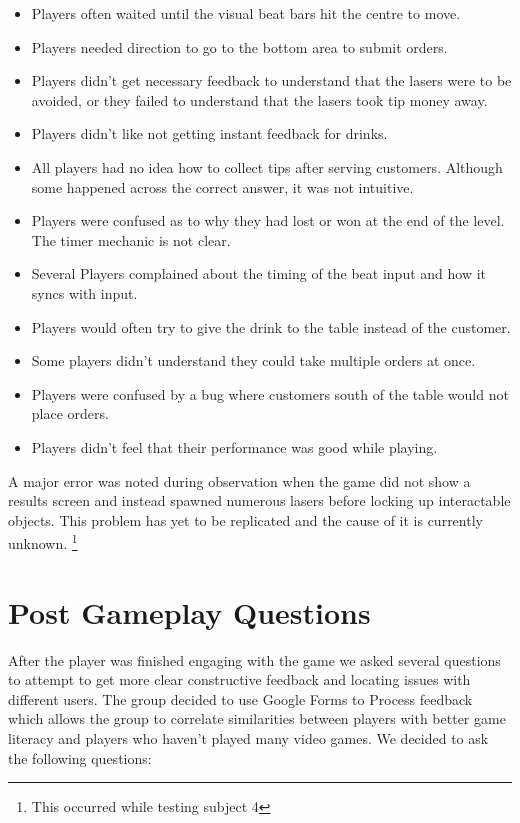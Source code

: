 \documentclass[twoside,twocolumn]{article}
\begin{document}
\begin{itemize}

    \item Players often waited until the visual beat bars hit the centre to move.
    \item Players needed direction to go to the bottom area to submit orders.
    \item Players didn't get necessary feedback to understand that the lasers were to be avoided, or they failed to understand that the lasers took tip money away.
    \item Players didn't like not getting instant feedback for drinks.
    \item All players had no idea how to collect tips after serving customers. Although some happened across the correct answer, it was not intuitive.
    \item Players were confused as to why they had lost or won at the end of the level. The timer mechanic is not clear.
    \item Several Players complained about the timing of the beat input and how it syncs with input.
    \item Players would often try to give the drink to the table instead of the customer.
    \item Some players didn't understand they could take multiple orders at once.
    \item Players were confused by a bug where customers south of the table would not place orders.
    \item Players didn't feel that their performance was good while playing.
\end{itemize}
A major error was noted during observation when the game did not
 show a results screen and instead spawned numerous
 lasers before locking up interactable objects. This problem has yet to 
be replicated and the cause of it is currently unknown. \footnote{This occurred while testing subject 4}




\section{Post Gameplay Questions}
After the player was finished engaging with the game we asked several questions to
attempt to get more clear constructive feedback and locating issues with different
 users. The group decided to use Google Forms to Process feedback which allows the group
 to correlate similarities between players with better game literacy and players who haven't played many video games. We decided to ask the following questions:
\end{document}
